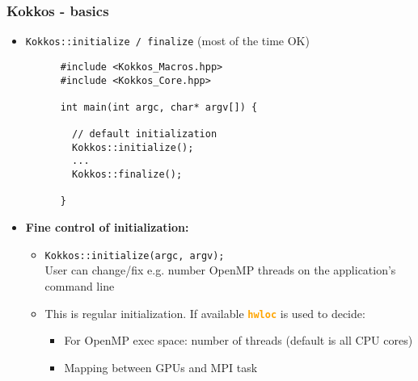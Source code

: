 \begin{frame}[fragile=singleslide]
  \frametitle{Kokkos - basics}

  \begin{itemize}
  \item \texttt{Kokkos::initialize / finalize} (most of the time OK)
    \begin{verbatim}
      #include <Kokkos_Macros.hpp>
      #include <Kokkos_Core.hpp>
      
      int main(int argc, char* argv[]) {
        
        // default initialization
        Kokkos::initialize();
        ...
        Kokkos::finalize();
        
      }
    \end{verbatim}
  \item \textbf{Fine control of initialization:}
    \begin{itemize}
    \item \texttt{Kokkos::initialize(argc, argv);}\\
      User can change/fix e.g. number OpenMP threads on the application's command line
    \item This is regular initialization. If available \textcolor{orange}{\textbf{\texttt{hwloc}}} is used to decide:
      \begin{itemize}
      \item For OpenMP exec space: number of threads (default is all CPU cores)
      \item Mapping between GPUs and MPI task
      \end{itemize}
    \end{itemize}
  \end{itemize}
  
\end{frame}


